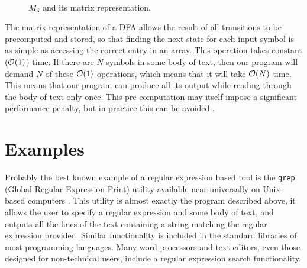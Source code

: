 \documentclass{bcthesis}
\newcommand{\footcite}[2]{\xspace\cite[pg.~{#2}]{#1}\xspace}
\begin{document}
		\begin{figure}[H]
			\setlength{\fboxrule}{0 pt}
			\centering
			 \\
			\caption{
				$M_3$ and its matrix representation.
			}
			\label{fig:m3_and_matrix}
		\end{figure}

		The matrix representation of a DFA allows the result of all transitions to be precomputed and stored, so that finding the next state for each input symbol is as simple as accessing the correct entry in an array.
		This operation takes constant ($\mathcal{O}(1)$) time.
		If there are $N$ symbols in some body of text, then our program will demand $N$ of these $\mathcal{O}(1)$ operations, which means that it will take $\mathcal{O}(N)$ time.
		This means that our program can produce all its output while reading through the body of text only once.
		This pre-computation may itself impose a significant performance penalty, but in practice this can be avoided \footcite{grep}{2--3}.

	\section{Examples} %
	\label{sec:applications_examples}
		Probably the best known example of a regular expression based tool is the \texttt{grep} (Global Regular Expression Print) utility available near-universally on Unix-based computers \footcite{grep}{1}.
		This utility is almost exactly the program described above, it allows the user to specify a regular expression and some body of text, and outputs all the lines of the text containing a string matching the regular expression provided.
		Similar functionality is included in the standard libraries of most programming languages.
		Many word processors and text editors, even those designed for non-technical users, include a regular expression search functionality.
\end{document}
